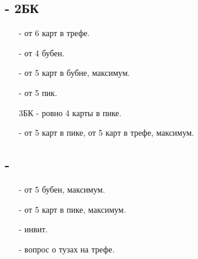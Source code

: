 \documentclass{article}
\begin{document}
\subsection{ - 2БК}
\begin{enumerate}
    \item[\cl{3}] - от 6 карт в трефе.
    \item[\di{3}] - от 4 бубен.
    \item[\he{3}] - от 5 карт в бубне, максимум.
    \item[\sp{3}] - от 5 пик.
    \item[3БК] - ровно 4 карты в пике.
    \item[\cl{4}] - от 5 карт в пике, от 5 карт в трефе, максимум.
\end{enumerate}
\subsection{ - }
\begin{enumerate}
    \item[\di{3}] - от 5 бубен, максимум.
    \item[\sp{3}] - от 5 карт в пике, максимум.
    \item[\cl{4}] - инвит.
    \item[\di{4}] - вопрос о тузах на трефе.
\end{enumerate}
\end{document}
